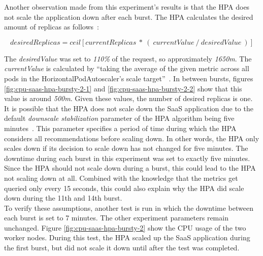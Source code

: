 Another observation made from this experiment's results is that the HPA does not scale the application down after each burst. The HPA calculates the desired amount of replicas as follows~\citep{hpa-algorithm-details}:

\[ desiredReplicas = ceil[currentReplicas\ *\ (\ currentValue\ /\ desiredValue\ )] \]

The \textit{desiredValue} was set to \textit{110\%} of the request, so approximately \textit{1650m}. The \textit{currentValue} is calculated by ``taking the average of the given metric across all pods in the HorizontalPodAutoscaler's scale target''~\citep{hpa-algorithm-details}. In between bursts, figures \ref{fig:cpu-saas-hpa-bursty-2-1} and \ref{fig:cpu-saas-hpa-bursty-2-2} show that this value is around \textit{500m}. Given these values, the number of desired replicas is one.\\

It is possible that the HPA does not scale down the SaaS application due to the default \textit{downscale stabilization} parameter of the HPA algorithm being five minutes~\citep{hpa-cooldown-delay}. This parameter specifies a period of time during which the HPA considers all recommendations before scaling down. In other words, the HPA only scales down if its decision to scale down has not changed for five minutes. The downtime during each burst in this experiment was set to exactly five minutes. Since the HPA should not scale down during a burst, this could lead to the HPA not scaling down at all. Combined with the knowledge that the metrics get queried only every 15 seconds, this could also explain why the HPA did scale down during the 11th and 14th burst. \\

To verify these assumptions, another test is run in which the downtime between each burst is set to 7 minutes. The other experiment parameters remain unchanged. Figure \ref{fig:cpu-saas-hpa-bursty-2} show the CPU usage of the two worker nodes. During this test, the HPA scaled up the SaaS application during the first burst, but did not scale it down until after the test was completed.  \\

